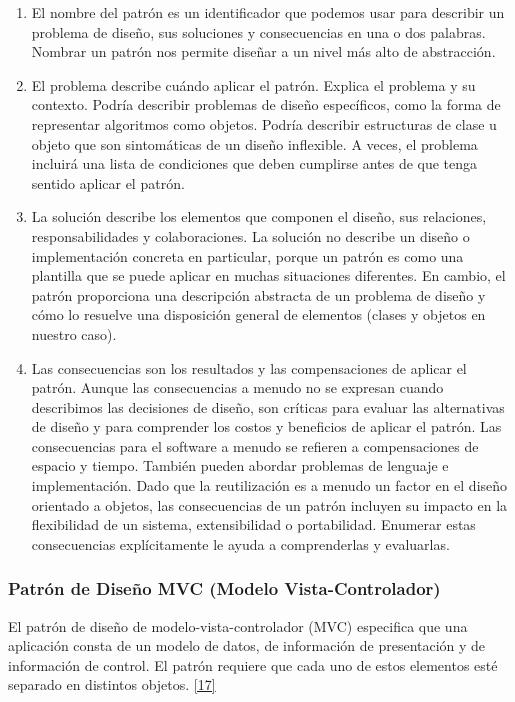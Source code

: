 \begin{enumerate}
	\item El nombre del patrón es un identificador que podemos usar para describir un problema de diseño, sus soluciones y consecuencias en una o dos palabras. Nombrar un patrón nos permite diseñar a un nivel más alto de abstracción.
	
	\item El problema describe cuándo aplicar el patrón. Explica el problema y su contexto. Podría describir problemas de diseño específicos, como la forma de representar algoritmos como objetos. Podría describir estructuras de clase u objeto que son sintomáticas de un diseño inflexible. A veces, el problema incluirá una lista de condiciones que deben cumplirse antes de que tenga sentido aplicar el patrón.
	
	\item La solución describe los elementos que componen el diseño, sus relaciones, responsabilidades y colaboraciones. La solución no describe un diseño o implementación concreta en particular, porque un patrón es como una plantilla que se puede aplicar en muchas situaciones diferentes. En cambio, el patrón proporciona una descripción abstracta de un problema de diseño y cómo lo resuelve una disposición general de elementos (clases y objetos en nuestro caso).
	
	\item Las consecuencias son los resultados y las compensaciones de aplicar el patrón. Aunque las consecuencias a menudo no se expresan cuando describimos las decisiones de diseño, son críticas para evaluar las alternativas de diseño y para comprender los costos y beneficios de aplicar el patrón. Las consecuencias para el software a menudo se refieren a compensaciones de espacio y tiempo. También pueden abordar problemas de lenguaje e implementación. Dado que la reutilización es a menudo un factor en el diseño orientado a objetos, las consecuencias de un patrón incluyen su impacto en la flexibilidad de un sistema, extensibilidad o portabilidad. Enumerar estas consecuencias explícitamente le ayuda a comprenderlas y evaluarlas.
\end{enumerate}

\subsubsection{Patrón de Diseño MVC (Modelo Vista-Controlador)}

El patrón de diseño de modelo-vista-controlador (MVC) especifica que una aplicación consta de un modelo de datos, de información de presentación y de información de control. El patrón requiere que cada uno de estos elementos esté separado en distintos objetos. \hyperlink{b17}{[17]}

